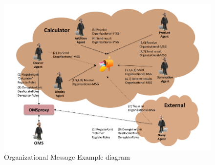 \begin{figure}[h!t]
	\centering
	\includegraphics[width=\textwidth]{Thomas/images/organizationalMessageExample}
	\caption{Organizational Message Example diagram}
  \label{fig:OMessageDiagram}
\end{figure}


